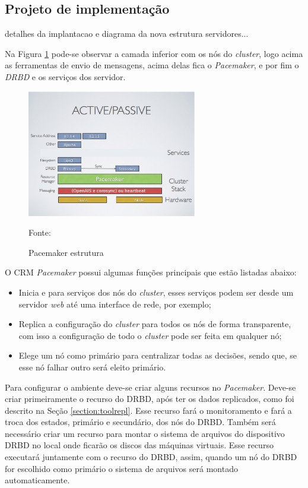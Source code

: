 \subsection{Projeto de implementação}
\label{section:projetoimpl}

detalhes da implantacao e diagrama da nova estrutura servidores...

Na Figura \ref{fig:pacemaker_tools} pode-se observar a camada inferior com os nós do \textit{cluster}, logo acima as ferramentas de envio de 
mensagens, acima delas fica o \textit{Pacemaker}, e por fim o \textit{DRBD} e os serviços dos servidor.

\begin{figure}[h!]
 \centering
 \includegraphics[width=280px]{img/pacemaker_tools.eps}
 \caption{Pacemaker estrutura}
 Fonte: \citet{pacemaker}
 \label{fig:pacemaker_tools}
\end{figure}

O \ac{CRM} \textit{Pacemaker} possui algumas funções principais que estão listadas abaixo:
\begin{itemize}
 \item Inicia e para serviços dos nós do \textit{cluster}, esses serviços podem ser desde um servidor \textit{web} até uma interface de rede, 
 por exemplo;
 \item Replica a configuração do \textit{cluster} para todos os nós de forma transparente, com isso a configuração de todo o \textit{cluster} 
 pode ser feita em qualquer nó;
 \item Elege um nó como primário para centralizar todas as decisões, sendo que, se esse nó falhar outro será eleito primário.
\end{itemize}

Para configurar o ambiente deve-se criar alguns recursos no \textit{Pacemaker}.
Deve-se criar primeiramente o recurso do \ac{DRBD}, após ter os dados replicados, como foi descrito na Seção \ref{section:toolrepl}. Esse recurso 
fará o monitoramento e fará a troca dos estados, primário e secundário, dos nós do \ac{DRBD}.
Também será necessário criar um recurso para montar o sistema de arquivos do dispositivo \ac{DRBD} no local onde ficarão os discos das máquinas
virtuais. Esse recurso executará juntamente com o recurso do \ac{DRBD}, assim, quando um nó do \ac{DRBD} for escolhido como primário o sistema de
arquivos será montado automaticamente.

